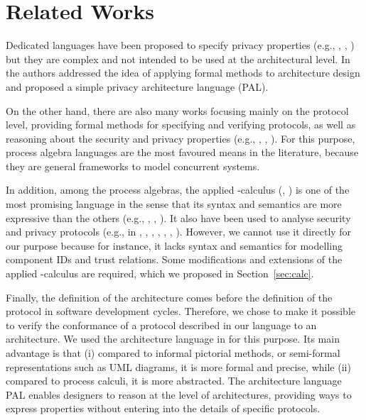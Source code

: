 \documentclass{llncs}
\begin{document}
\section{Related Works}
\label{related}
Dedicated languages have been proposed to specify privacy properties 
(e.g., \cite{barth:2006}, \cite{becker:2011}, \cite{jafari:2011}) but they are complex and not intended to be used at the architectural level. 
In \cite{TM-STM2014,Antignac:2014} the authors addressed the idea of applying formal 
methods to architecture design and proposed a simple privacy architecture   
language (PAL). 

On the other hand, there are also many works focusing mainly on the protocol level,  
providing formal methods for specifying and verifying protocols, as well as reasoning 
about the security and privacy properties (e.g., \cite{meadows:2003}, \cite{paulson:1998}, \cite{burrows:1990}). 
For this purpose, process algebra languages are the most favoured means in the literature, 
because they are general frameworks to model concurrent systems. 

In addition, among the process algebras, the applied -calculus (\cite{ryan:2011}, 
\cite{fournet01mobile}) is one of the most promising language in the sense that its syntax and semantics are more 
expressive than the others (e.g., \cite{pi}, \cite{spi}, \cite{csp}). It  
also have been used to analyse security and privacy protocols (e.g., in \cite{Fournet:2002}, \cite{Delaune:2008}, 
\cite{DongJP:2010}, \cite{Li:2009}, \cite{Delaune:2009}, \cite{BackesZero:2008}, \cite{Kremer:2005}).  However, we cannot use it directly for our purpose because for instance, it lacks syntax and semantics for 
modelling component IDs and trust relations. Some modifications and extensions of the 
applied -calculus are required, which we proposed in Section~\ref{sec:calc}.  

Finally, the definition of the architecture comes before the definition of the protocol 
in software development cycles. Therefore, we 
chose to make it possible to verify the conformance of a protocol described in our 
language to an architecture. We used the architecture language in \cite{TM-STM2014} 
for this purpose. Its main advantage is that (i) compared to informal 
pictorial methods, or semi-formal representations such as UML diagrams, it is more formal 
and precise, while (ii) compared to process calculi, it is more abstracted.  The 
architecture language PAL enables designers to reason at the level of architectures, 
providing ways to express properties without entering into the details of specific protocols.   
\end{document}
